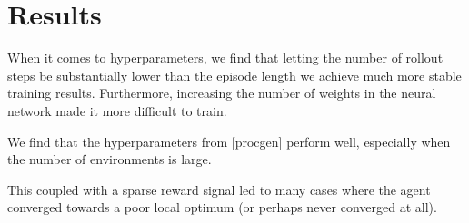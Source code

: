 \chapter{Results}
\label{cha:results}

% 
% 

When it comes to hyperparameters, we find that letting the number of rollout steps be substantially lower than the episode length we achieve much more stable training results.
Furthermore, increasing the number of weights in the neural network made it more difficult to train.

We find that the hyperparameters from [procgen] perform well, especially when the number of environments is large.


This coupled with a sparse reward signal led to many cases where the agent converged towards a poor local optimum (or perhaps never converged at all).
